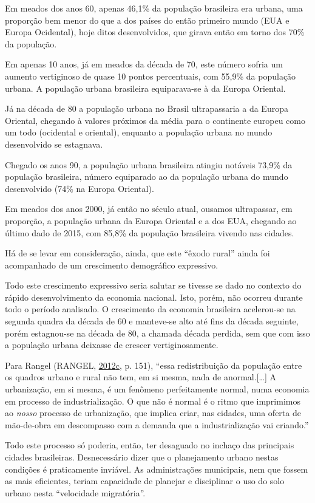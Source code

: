 \documentclass[a4paper, 12pt]{article}
\begin{document}
Em meados dos anos 60, apenas 46,1\% da população brasileira era urbana,
uma proporção bem menor do que a dos países do então primeiro mundo (EUA
e Europa Ocidental), hoje ditos desenvolvidos, que girava então em torno
dos 70\% da população.

Em apenas 10 anos, já em meados da década de 70, este número sofria um
aumento vertiginoso de quase 10 pontos percentuais, com 55,9\% da
população urbana. A população urbana brasileira equiparava-se à da
Europa Oriental.

Já na década de 80 a população urbana no Brasil ultrapassaria a da
Europa Oriental, chegando à valores próximos da média para o continente
europeu como um todo (ocidental e oriental), enquanto a população urbana
no mundo desenvolvido se estagnava.

Chegado os anos 90, a população urbana brasileira atingiu notáveis
73,9\% da população brasileira, número equiparado ao da população urbana
do mundo desenvolvido (74\% na Europa Oriental).

Em meados dos anos 2000, já então no século atual, ousamos ultrapassar,
em proporção, a população urbana da Europa Oriental e a dos EUA,
chegando ao último dado de 2015, com 85,8\% da população brasileira
vivendo nas cidades.

Há de se levar em consideração, ainda, que este ``êxodo rural'' ainda
foi acompanhado de um crescimento demográfico expressivo.

Todo este crescimento expressivo seria salutar se tivesse se dado no
contexto do rápido desenvolvimento da economia nacional. Isto, porém,
não ocorreu durante todo o período analisado. O crescimento da economia
brasileira acelerou-se na segunda quadra da década de 60 e manteve-se
alto até fins da década seguinte, porém estagnou-se na década de 80, a
chamada década perdida, sem que com isso a população urbana deixasse de
crescer vertiginosamente.

Para Rangel (RANGEL,
\protect\hyperlink{ref-rangel1986a}{2012}\protect\hyperlink{ref-rangel1986a}{c},
p. 151), ``essa redistribuição da população entre os quadros urbano e
rural não tem, em si mesma, nada de anormal.{[}\ldots{}{]} A
urbanização, em si mesma, é um fenômeno perfeitamente normal, numa
economia em processo de industrialização. O que não é normal é o ritmo
que imprimimos ao \emph{nosso} processo de urbanização, que implica
criar, nas cidades, uma oferta de mão-de-obra em descompasso com a
demanda que a industrialização vai criando.''

Todo este processo só poderia, então, ter desaguado no inchaço das
principais cidades brasileiras. Desnecessário dizer que o planejamento
urbano nestas condições é praticamente inviável. As administrações
municipais, nem que fossem as mais eficientes, teriam capacidade de
planejar e disciplinar o uso do solo urbano nesta ``velocidade
migratória''.
\end{document}
